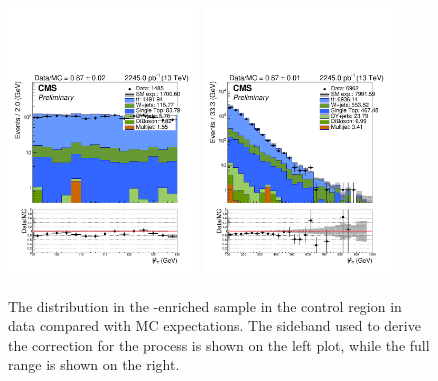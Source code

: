 \begin{figure}[!h]
  \centering
  \includegraphics[width=0.45\textwidth]{figures/sidebandCorr/mhtSideband_NMinusOne_MHT_TTJets}
  \includegraphics[width=0.45\textwidth]{figures/sidebandCorr/mht_NMinusOne_MHT_TTJets}
  \caption{The \mht distribution in the \ttbar-enriched sample in the \mj control region in data compared with MC expectations. 
     The \mht sideband used to derive the correction for the \ttbar process is shown on the left plot, while the full range is shown on the right.}
  \label{fig:ttjets_MHTsideband}
\end{figure}



